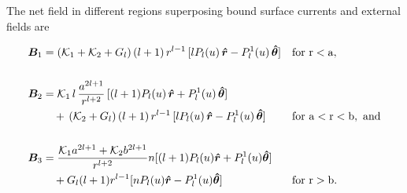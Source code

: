 The net field in different regions superposing bound surface currents and external fields are 

\begin{align}
    \bm B_1 &=(\mathcal{K}_1+\mathcal{K}_2+G_l) \, (l+1)\, r^{l-1} \, [l P_l(u) \, \bm{\hat{r}} -  P_l^1(u)  \, \bm{\hat{\theta}}] && \mathrm{for~r<a,}\label{r<R}\\[15pt]
    \bm B_2 &=\mathcal{K}_1 \, l\, \frac{a^{2l+1}}{r^{l+2}} \,[(l+1) P_l(u) \, \bm{\hat{r}} +  P_l^1(u)  \, \bm{\hat{\theta}} ]\notag\\
&\quad +\, (\mathcal{K}_2+G_l) \, (l+1)\, r^{l-1} \, [l P_l(u) \, \bm{\hat{r}} -  P_l^1(u)  \, \bm{\hat{\theta}}] &&\mathrm{for~a<r<b,~and}\label{R<r<R+t}\\[15pt]
    \bm B_3 &= \frac{\mathcal{K}_1a^{2l+1} + \mathcal{K}_2 b^{2l+1} }{r^{l+2}} n [(l+1) P_l(u) \bm{\hat{r}} +  P_l^1(u)  \bm{\hat{\theta}} ]  \notag\\
&\quad  + G_l (l+1) r^{l-1} [n P_l(u) \bm{\hat{r}} - P_l^1(u)  \bm{\hat{\theta}} ]&& \mathrm{for~r>b.}\label{r>R}
\end{align}
%
%

